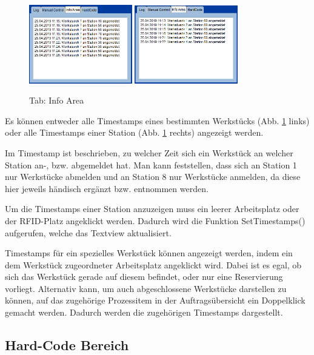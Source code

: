 \begin{figure}[htb]
    \centering
    \includegraphics[width=0.4\textwidth]{Abbildungen/TimestampsWerkstueck.png}
    \includegraphics[width=0.4\textwidth]{Abbildungen/TimestampsStation.png}
    \caption{Tab: Info Area}		
    \label{fig:InfoArea}
\end{figure}

Es können entweder alle Timestamps eines bestimmten Werkstücks (Abb. \ref{fig:InfoArea} links) oder alle Timestamps einer Station (Abb. \ref{fig:InfoArea} rechts) angezeigt werden.

Im Timestamp ist beschrieben, zu welcher Zeit sich ein Werkstück an welcher Station an-, bzw. abgemeldet hat. Man kann feststellen, dass sich an Station 1 nur Werkstücke abmelden und an Station 8 nur Werkstücke anmelden, da diese hier jeweils händisch ergänzt bzw. entnommen werden. 

Um die Timestamps einer Station anzuzeigen muss ein leerer Arbeitsplatz oder der RFID-Platz angeklickt werden. Dadurch wird die Funktion SetTimestamps() aufgerufen, welche das Textview aktualisiert. 

Timestamps für ein spezielles Werkstück können angezeigt werden, indem ein dem Werkstück zugeordneter Arbeitsplatz angeklickt wird. Dabei ist es egal, ob sich das Werkstück gerade auf diesem befindet, oder nur eine Reservierung vorliegt. Alternativ kann, um auch abgeschlossene Werkstücke darstellen zu können, auf das zugehörige Prozessitem in der Auftragsübersicht ein Doppelklick gemacht werden. Dadurch werden die zugehörigen Timestamps dargestellt. 

\subsection{Hard-Code Bereich}
\label{sec:HardCode}

